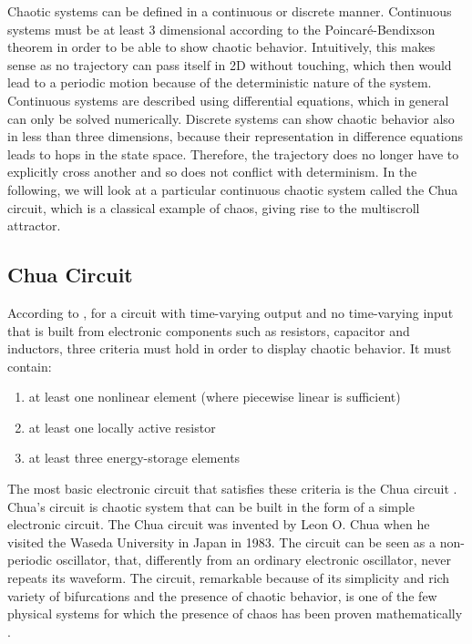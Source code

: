 \documentclass[main]{subfiles}
\begin{document}
Chaotic systems can be defined in a continuous or discrete manner. %
%
Continuous systems must be at least 3 dimensional according to the Poincaré-Bendixson theorem \cite{bib:Bendixon1901} in order to be able to show chaotic behavior. %
%
Intuitively, this makes sense as no trajectory can pass itself in 2D without touching, which then would lead to a periodic motion because of the deterministic nature of the system. %
%
Continuous systems are described using differential equations, which in general can only be solved numerically. %
%
Discrete systems can show chaotic behavior also in less than three dimensions, because their representation in difference equations leads to hops in the state space. %
%
Therefore, the trajectory does no longer have to explicitly cross another and so does not conflict with determinism. %
%
In the following, we will look at a particular continuous chaotic system called the Chua circuit, which is a classical example of chaos, giving rise to the multiscroll attractor.

\subsection{Chua Circuit}
\label{subsec:chua-circuit}

According to \cite{bib:Kennedy1993}, for a circuit with time-varying output and no time-varying input that is built from electronic components such as resistors, capacitor and inductors, three criteria must hold in order to display chaotic behavior. %
%
It must contain:
\begin{enumerate}
  \item at least one nonlinear element (where piecewise linear is sufficient)
  \item at least one locally active resistor
  \item at least three energy-storage elements
\end{enumerate}
  
The most basic electronic circuit that satisfies these criteria is the Chua circuit \cite{bib:Matsumoto1985}. %
%
Chua's circuit is chaotic system that can be built in the form of a simple electronic circuit. %
%
The Chua circuit was invented by Leon O. Chua when he visited the Waseda University in Japan in 1983. %
%
The circuit can be seen as a non-periodic oscillator, that, differently from an ordinary electronic oscillator, never repeats its waveform. %
%
The circuit, remarkable because of its simplicity and rich variety of bifurcations and the presence of chaotic behavior, is one of the few physical systems for which the presence of chaos has been proven mathematically \cite{bib:Kennedy1993}.
\end{document}
